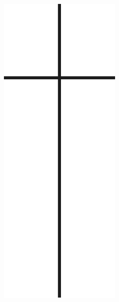 \documentclass[ngerman,a4paper,11pt]{scrreprt}
\begin{document}
\begin{figure}[H]
\centering
\includegraphics[width=\textwidth,height=.8\textheight]{Bilder/Bilder/./750_0010_18755_Todesanzeigen_Kreuz.png}
\end{figure}
\end{document}
